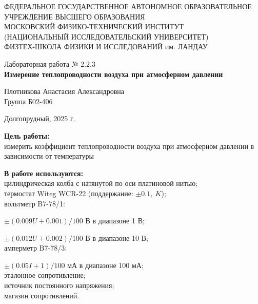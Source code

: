 \documentclass[a4paper,12pt]{article} %
\begin{document}
\begin{center}
	\footnotesize{ФЕДЕРАЛЬНОЕ ГОСУДАРСТВЕННОЕ АВТОНОМНОЕ ОБРАЗОВАТЕЛЬНОЕ 			УЧРЕЖДЕНИЕ ВЫСШЕГО ОБРАЗОВАНИЯ}\\
	\footnotesize{МОСКОВСКИЙ ФИЗИКО-ТЕХНИЧЕСКИЙ ИНСТИТУТ\\(НАЦИОНАЛЬНЫЙ 			ИССЛЕДОВАТЕЛЬСКИЙ УНИВЕРСИТЕТ)}\\
	\footnotesize{ФИЗТЕХ-ШКОЛА ФИЗИКИ И ИССЛЕДОВАНИЙ им. ЛАНДАУ\\}
	\hfill \break
	\hfill \break
	\hfill \break
	\hfill \break
\end{center}

\begin{center}   
    \hfill \break
	\hfill \break
	\hfill \break
	\hfill \break    \hfill \break
	\hfill \break
	\hfill \break
	\hfill \break
    \hfill \break
    \hfill \break
	\hfill \break
	\large{Лабораторная работа № 2.2.3\\\textbf{Измерение теплопроводности воздуха при атмосферном давлении}}\\
	\begin{flushright}
		Плотникова Анастасия Александровна\\
		Группа Б02-406
	\end{flushright}
	\hfill \break
	\hfill \break
	\hfill \break
\end{center}
\hfill \break
\hfill \break
\hfill \break
\hfill \break
\hfill \break
\hfill \break
\hfill \break
\hfill \break
\hfill \break
\hfill \break
\hfill \break
\hfill \break
\hfill \break
\begin{center}
	Долгопрудный, 2025 г.
\end{center}
\thispagestyle{empty}
\newpage
	\textbf{Цель работы:}\\ 
  измерить коэффициент теплопроводности воздуха при атмосферном
давлении в зависимости от температуры
	\hfill \break
	
	\textbf{В работе используются:}\\ 
  цилиндрическая колба с натянутой по оси платиновой нитью; \\
  термостат Witeg WCR-22 (поддержание: $\pm 0.1 ,\ K$); \\
  вольтметр B7-78/1: 
  \par $\pm (0.009U + 0.001)/100$ В в диапазоне 1 В; 
  \par $\pm (0.012U + 0.002)/100$ В в диапазоне 10 В; \\
  амперметр B7-78/3: 
  \par $\pm (0.05 I + 1)/100$ мА в диапазоне 100 мА; \\
  эталонное сопротивление; \\
  источник постоянного напряжения; \\
  магазин сопротивлений.
\end{document}
